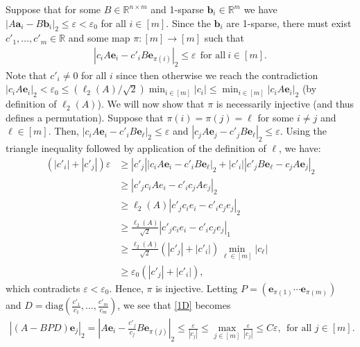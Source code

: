 \documentclass[journal, onecolumn]{IEEEtran}
\begin{document}
Suppose that for some $B \in \mathbb{R}^{n \times m}$ and 1-sparse $\mathbf{b}_i \in \mathbb{R}^m$ we have  $|A\mathbf{a}_i - B\mathbf{b}_i|_2 \leq \varepsilon < \varepsilon_0$ for all $i \in [m]$. Since the $\mathbf{b}_i$ are 1-sparse, there must exist $c'_1, \ldots, c'_m \in \mathbb{R}$ and some map $\pi: [m] \to [m]$ such that 
\begin{align}\label{1D}
|c_iA\mathbf{e}_i - c'_iB\mathbf{e}_{\pi(i)}|_2 \leq \varepsilon \ \ \text{for all} \  i \in [m].
\end{align} 
Note that $c'_i \neq 0$ for all $i$ since then otherwise we reach the contradiction $|c_iA\mathbf{e}_i|_2 < \varepsilon_0 \leq (\ell_2(A)/\sqrt{2}) \min_{i \in [m]}|c_i| \leq \min_{i\in [m]}|c_iA\mathbf{e}_i|_2$ (by definition of $\ell_2(A)$). We will now show that $\pi$ is necessarily injective (and thus defines a permutation). Suppose that $\pi(i) = \pi(j) = \ell$ for some $i \neq j$ and $\ell \in [m]$. Then, $|c_iA\mathbf{e}_i - c'_iB\mathbf{e}_{\ell}|_2  \leq \varepsilon$ and $|c_jA\mathbf{e}_j - c'_jB\mathbf{e}_{\ell}|_2 \leq \varepsilon$. Using the triangle inequality followed by application of the definition of $\ell$, we have:
\begin{align*}
(|c'_i| + |c'_j|) \varepsilon
&\geq |c'_j||c_iA\mathbf{e}_i - c'_iB\mathbf{e}_{\ell}|_2 + |c'_i||c'_jB\mathbf{e}_{\ell} - c_jA\mathbf{e}_j|_2 \\
&\geq |c'_jc_iAe_i - c'_ic_jAe_j|_2 \\
&\geq \ell_2(A)|c'_jc_ie_i - c'_ic_je_j|_2 \\
&\geq \frac{\ell_2(A)}{\sqrt{2}}|c'_jc_ie_i - c'_ic_je_j|_1 \\
&\geq \frac{\ell_2(A)}{\sqrt{2}} \left( |c'_j| + |c'_i| \right) \min_{\ell \in [m]} |c_\ell | \\
&\geq \varepsilon_0 \left( |c'_j| + |c'_i| \right),
\end{align*}
%
which contradicts $\varepsilon < \varepsilon_0$. Hence, $\pi$ is injective. Letting $P = \left( \mathbf{e}_{\pi(1)} \cdots \mathbf{e}_{\pi(m)}\right)$ and $D = \text{diag}(\frac{c'_1}{c_1},\ldots,\frac{c'_m}{c_m})$, we see that \eqref{1D} becomes 
\begin{align}
|(A - BPD)\mathbf{e}_j|_2 = |A\mathbf{e}_i - \frac{c'_j}{c_j}B\mathbf{e}_{\pi(j)}|_2 \leq \frac{\varepsilon}{|c_j|} \leq \max_{j \in [m]} \frac{\varepsilon}{|c_j|} \leq C\varepsilon, \ \ \text{for all } j \in [m].
\end{align}
\end{document}
